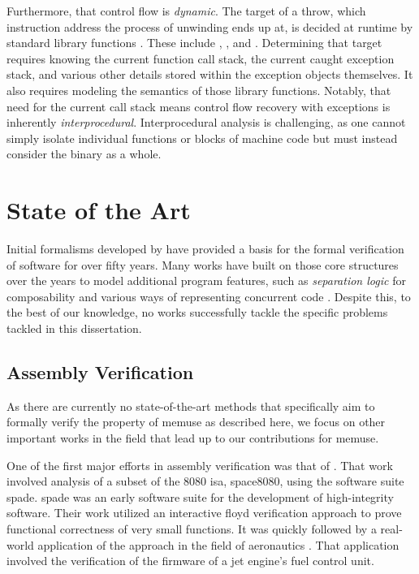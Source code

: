 Furthermore, that control flow is \emph{dynamic}.
The target of a throw, which instruction address the process of unwinding ends up at, is decided at runtime by standard library functions \autocite{cxxEhAbi}.
These include , ,
and .
Determining that target requires knowing the current function call stack, the current caught exception stack, and various other details stored within the exception objects themselves.
It also requires modeling the semantics of those library functions.
Notably, that need for the current call stack means control flow recovery with exceptions is inherently \emph{interprocedural}.
Interprocedural analysis is challenging, as one cannot simply isolate individual functions or blocks of machine code but must instead consider the binary as a whole.

\section{State of the Art}
Initial formalisms developed by \textcite{floyd1967assigning,hoare1969axiomatic} have provided a basis for the formal verification of software for over fifty years.
Many works have built on those core structures over the years to model additional program features, such as \emph{separation logic} \autocite{reynolds2002separation} for composability and various ways of representing concurrent code \autocite{owicki1976gries,xu1997rely-guarantee}.
Despite this, to the best of our knowledge, no works successfully tackle the specific problems tackled in this dissertation.

\subsection{Assembly Verification}
As there are currently no state-of-the-art methods that specifically aim to formally verify the property of \gls{memuse} as described here, we focus on other important works in the field that lead up to our contributions for \gls{memuse}.

One of the first major efforts in assembly verification was that of \textcite{clutterbuck1986validation,clutterbuck1988verification}.
That work involved analysis of a subset of the \gls{8080} \ac{isa}, \gls{space8080}, using the software suite \ac{spade}.
\Ac{spade} was an early software suite for the development of high-integrity software.
Their work utilized an interactive \gls{floyd} verification approach to prove functional correctness of very small functions.
It was quickly followed by a real-world application of the approach in the field of aeronautics \autocite{oneill1988verification}.
That application involved the verification of the firmware of a jet engine's fuel control unit.


